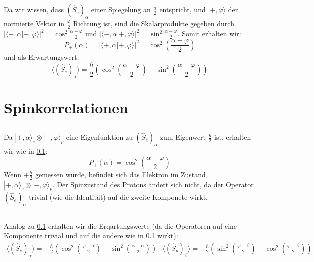 \documentclass[11pt, ngerman, fleqn, DIV=15, headinclude]{scrartcl}
\begin{document}
\subsection{} \label{pa}
	Da wir wissen, dass $(\hat{S}_e)_\alpha$ einer Spiegelung an $\frac{\alpha}{2}$ entspricht, und $|+,\varphi\rangle$ der normierte Vektor in $\frac{\varphi}{2}$ Richtung ist, sind die  Skalarprodukte gegeben durch $|\langle+,\alpha|+,\varphi\rangle|^2=\cos^2\frac{\alpha-\varphi}{2}$ und $|\langle-,\alpha|+,\varphi\rangle|^2=\sin^2\frac{\alpha-\varphi}{2}$. Somit erhalten wir:
	\begin{equation*}
		P_+(\alpha)=|\langle+,\alpha|+,\varphi\rangle|^2=\cos^2\left(\frac{\alpha-\varphi}{2}\right)
	\end{equation*}
	und als Erwartungswert:
	\begin{equation*}
		\langle(\hat{S}_e)_\alpha \rangle=\frac{\hbar}{2} \left(\cos^2\left(\frac{\alpha-\varphi}{2}\right)-\sin^2\left(\frac{\alpha-\varphi}{2}\right)\right)
	\end{equation*}



\section{Spinkorrelationen}
\subsection{}
	Da $|+,\alpha\rangle_e\otimes|-,\varphi\rangle_p$ eine Eigenfunktion zu $(\hat{S}_e)_\alpha$ zum Eigenwert $\frac{\hbar}{2}$ ist, erhalten wir wie in \ref{pa}:
	\begin{equation*}
		P_+(\alpha)= \cos^2\left(\frac{\alpha-\varphi}{2}\right)
	\end{equation*}
	Wenn $+\frac{\hbar}{2}$ gemessen wurde, befindet sich das Elektron im Zustand $|+,\alpha\rangle_e\otimes|-,\varphi\rangle_p$. Der Spinzustand des Protons ändert sich nicht, da der Operator $(\hat{S}_e)_\alpha$ trivial (wie die Identität) auf die zweite Komponete wirkt.

\subsection{}
	Analog zu \ref{pa} erhalten wir die Erqartungswerte (da die Operatoren auf eine Komponente trivial und auf die andere wie in \ref{pa} wirkt):
	\begin{align*}
		\langle(\hat{S}_e)_\alpha\rangle=&\frac{\hbar}{2}\left(\cos^2\left(\frac{\varphi-\alpha}{2}\right)-\sin^2\left(\frac{\varphi-\alpha}{2}\right)\right) & \langle(\hat{S}_p)_\beta\rangle=& \frac{\hbar}{2}\left(\sin^2\left(\frac{\varphi-\beta}{2}\right)-\cos^2\left(\frac{\varphi-\beta}{2}\right)\right)
	\end{align*}	
\end{document}

